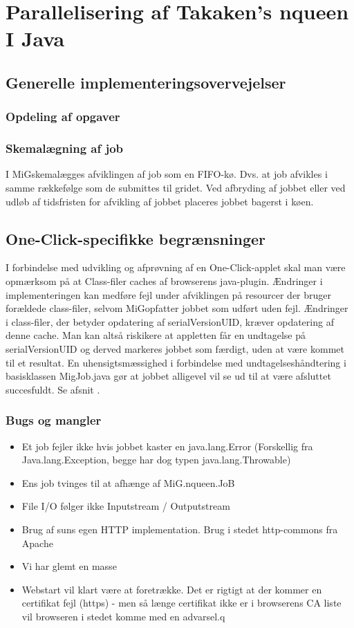 \documentclass[pdf,draft,a4paper,10pt]{article}
\newcommand{\mig}{MiG}
\newcommand{\oc}{One-Click}
\begin{document}
\section{Parallelisering af Takaken's nqueen I Java}

\subsection{Generelle implementeringsovervejelser}
\subsubsection{Opdeling af opgaver}


\subsubsection{Skemalægning af job}
I \mig skemalægges afviklingen af job som en FIFO-kø. Dvs. at job afvikles i samme rækkefølge som de submittes til gridet. Ved afbryding af jobbet eller ved udløb af tidsfristen for afvikling af jobbet placeres jobbet bagerst i køen.  


\subsection{\oc-specifikke begrænsninger}

I forbindelse med udvikling og afprøvning af en \oc-applet skal man være opmærksom på at Class-filer caches af browserens java-plugin. Ændringer i implementeringen kan medføre fejl under afviklingen på resourcer der bruger forældede class-filer, selvom \mig opfatter jobbet som udført uden fejl. Ændringer i class-filer, der betyder opdatering af serialVersionUID, kræver opdatering af denne cache. Man kan altså riskikere at appletten får en undtagelse på serialVersionUID og derved markeres jobbet som færdigt, uden at være kommet til et resultat. En uhensigtsmæssighed i forbindelse med undtagelseshåndtering i basisklassen MigJob.java gør at jobbet alligevel vil se ud til at være afsluttet succesfuldt. Se afsnit \cite{bugs}. 


\subsubsection{Bugs og mangler}\label{bugs}
\begin{itemize}
	\item Et job fejler ikke hvis jobbet kaster en java.lang.Error (Forskellig fra Java.lang.Exception, begge har dog typen java.lang.Throwable)
	\item Ens job tvinges til at afhænge af MiG.nqueen.JoB
	\item File I/O følger ikke Inputstream / Outputstream	
	\item Brug af suns egen HTTP implementation. Brug i stedet http-commons fra Apache
	\item Vi har glemt en masse 
	\item Webstart vil klart være at foretrække. Det er rigtigt at der kommer en certifikat fejl (https) - men så længe certifikat ikke er i browserens CA liste vil browseren i stedet komme med en advarsel.q
\end{itemize}
\end{document}
